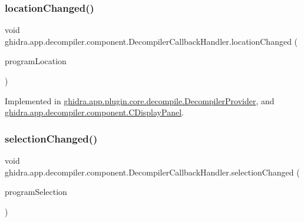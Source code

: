 \mbox{\label{interfaceghidra_1_1app_1_1decompiler_1_1component_1_1_decompiler_callback_handler_aca06fb5e7e930f4b89195dbdf60d95c3}} 
\subsubsection{\texorpdfstring{locationChanged()}{locationChanged()}}
{\footnotesize\ttfamily void ghidra.\+app.\+decompiler.\+component.\+Decompiler\+Callback\+Handler.\+location\+Changed (\begin{DoxyParamCaption}\item[{Program\+Location}]{program\+Location }\end{DoxyParamCaption})}



Implemented in \mbox{\hyperlink{classghidra_1_1app_1_1plugin_1_1core_1_1decompile_1_1_decompiler_provider_afbefb9a625e7ff455be0aa5352f52347}{ghidra.\+app.\+plugin.\+core.\+decompile.\+Decompiler\+Provider}}, and \mbox{\hyperlink{classghidra_1_1app_1_1decompiler_1_1component_1_1_c_display_panel_a7f57fbf9d9615e6d475813776462beac}{ghidra.\+app.\+decompiler.\+component.\+C\+Display\+Panel}}.

\mbox{\label{interfaceghidra_1_1app_1_1decompiler_1_1component_1_1_decompiler_callback_handler_a9dc1e47dfe1bdecaa25b5db9d06cd1d7}} 
\subsubsection{\texorpdfstring{selectionChanged()}{selectionChanged()}}
{\footnotesize\ttfamily void ghidra.\+app.\+decompiler.\+component.\+Decompiler\+Callback\+Handler.\+selection\+Changed (\begin{DoxyParamCaption}\item[{Program\+Selection}]{program\+Selection }\end{DoxyParamCaption})}



